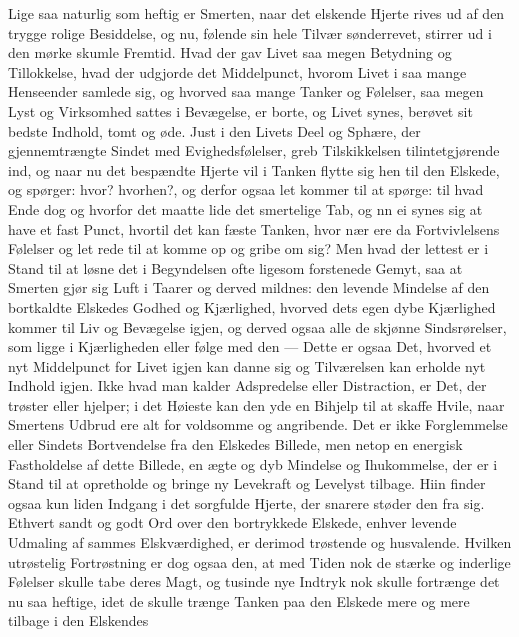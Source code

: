 \documentclass[12pt,a4paper]{book}
\newcommand{\apage}[1]{\marginnote{\footnotesize\textit{[#1]}}}
\begin{document}
Lige saa naturlig som heftig er Smerten, naar det elskende Hjerte rives
ud af den trygge rolige Besiddelse, og nu, følende sin hele Tilvær
sønderrevet, stirrer ud i den mørke skumle Fremtid. Hvad der gav Livet
saa megen Betydning og Tillokkelse, hvad der udgjorde det Middelpunct,
hvorom Livet i saa mange Henseender samlede sig, og hvorved saa mange
Tanker og Følelser, saa megen Lyst og Virksomhed sattes i Bevægelse, er
borte, og Livet synes, berøvet sit bedste Indhold, tomt og øde. Just i
den Livets Deel og Sphære, der gjennemtrængte Sindet med
Evighedsfølelser, greb Tilskikkelsen tilintetgjørende ind, og naar nu det
bespændte Hjerte vil i Tanken flytte sig hen til
\apage{166} den Elskede, og spørger: hvor? hvorhen?, og derfor ogsaa let kommer til
at spørge: til hvad Ende dog og hvorfor det maatte lide det smertelige
Tab, og nn ei synes sig at have et fast Punct, hvortil det kan fæste
Tanken, hvor nær ere da Fortvivlelsens Følelser og let rede til at komme
op og gribe om sig? Men hvad der lettest er i Stand til at løsne det i
Begyndelsen ofte ligesom forstenede Gemyt, saa at Smerten gjør sig Luft i
Taarer og derved mildnes: den levende Mindelse af den bortkaldte
Elskedes Godhed og Kjærlighed, hvorved dets egen dybe Kjærlighed kommer
til Liv og Bevægelse igjen, og derved ogsaa alle de skjønne Sindsrørelser,
som ligge i Kjærligheden eller følge med den --- Dette er ogsaa Det,
hvorved et nyt Middelpunct for Livet igjen kan danne sig og Tilværelsen
kan erholde nyt Indhold igjen. Ikke hvad man kalder Adspredelse eller
Distraction, er Det, der trøster eller hjelper; i det Høieste kan den yde
en Bihjelp til at skaffe Hvile, naar Smertens Udbrud ere alt for
voldsomme og angribende. Det er ikke Forglemmelse eller Sindets
Bortvendelse fra den Elskedes Billede, men netop en energisk Fastholdelse
af dette Billede, en ægte og dyb Mindelse og Ihukommelse, der er i Stand
til at opretholde og bringe ny Levekraft og Levelyst tilbage. Hiin finder
ogsaa kun liden Indgang i det sorgfulde Hjerte, der snarere støder den
fra sig. Ethvert sandt og godt Ord over den bortrykkede Elskede, enhver
levende Udmaling af sammes Elskværdighed, \apage{167} er derimod trøstende og
husvalende. Hvilken utrøstelig Fortrøstning er dog ogsaa den, at med
Tiden nok de stærke og inderlige Følelser skulle tabe deres Magt, og
tusinde nye Indtryk nok skulle fortrænge det nu saa heftige, idet de
skulle trænge Tanken paa den Elskede mere og mere tilbage i den Elskendes
\end{document}
